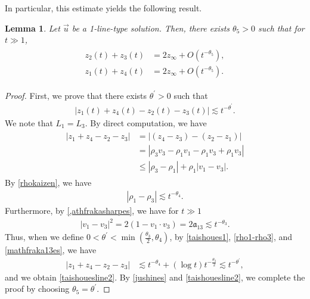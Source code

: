 \documentclass[reqno]{amsart}
\theoremstyle{plain}
\newtheorem{lemma}[theorem]{Lemma}
\theoremstyle{definition}
\numberwithin{equation}{section}
\begin{document}
In particular, this estimate yields the following result.
\begin{lemma}
Let $\vec{u}$ be a 1-line-type solution. Then, there exists $\theta_5>0$ such that for $t\gg 1$,
\begin{align}\label{taishouesline}
\begin{aligned}
z_2(t)+z_3(t)&=2z_{\infty}+O\left(t^{-\theta_5}\right),
\\
z_1(t)+z_4(t)&=2z_{\infty}+O\left(t^{-\theta_5}\right).
\end{aligned}
\end{align}
\end{lemma}


\begin{proof}
First, we prove that there exists $\theta^{\prime}>0$ such that 
\begin{align}\label{taishouesline2}
\left|z_1(t)+z_4(t)-z_2(t)-z_3(t)\right|\lesssim t^{-\theta^{\prime}}.
\end{align}
We note that $L_1=L_3$. By direct computation, we have
\begin{align}\label{taishoues1}
\begin{aligned}
\left|z_1+z_4-z_2-z_3\right|&=\left|\left(z_4-z_3\right)-\left(z_2-z_1\right)\right|
\\
&=\left|\rho_3v_3-\rho_1v_1-\rho_1v_3+\rho_1v_3 \right|
\\
&\leq \left|\rho_3-\rho_1\right|+\rho_1\left|v_1-v_3\right|.
\end{aligned}
\end{align}
By \eqref{rhokaizen}, we have
\begin{align}\label{rho1-rho3}
\left|\rho_1-\rho_3\right|\lesssim t^{-\theta_4}.
\end{align}
Furthermore, by \eqref{,athfrakasharpes}, we have for $t\gg 1$
\begin{align}\label{mathfraka13es}
\left|v_1-v_3\right|^2=2\left(1-v_1\cdot v_3\right)=2\mathfrak{a}_{13}\lesssim t^{-\theta_3}.
\end{align}
Thus, when we define $0<\theta^{\prime}<\min{(\frac{\theta_3}{2},\theta_4)}$, by \eqref{taishoues1}, \eqref{rho1-rho3}, and \eqref{mathfraka13es}, we have
\begin{align*}
\left|z_1+z_4-z_2-z_3\right|&\lesssim t^{-\theta_4}+\left(\log{t}\right)t^{-\frac{\theta_3}{2}}\lesssim t^{-\theta^{\prime}},
\end{align*}
and we obtain \eqref{taishouesline2}. By \eqref{jushines} and \eqref{taishouesline2}, we complete the proof by choosing $\theta_5=\theta^{\prime}$.
\end{proof}
\end{document}
